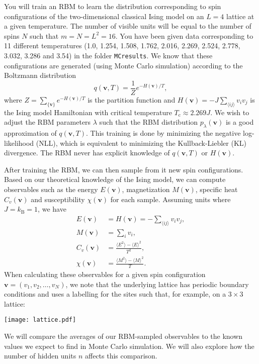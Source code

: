 \documentclass[letterpaper]{scrartcl}
\newcommand{\beq}{\begin{equation}}
\newcommand{\eeq}{\end{equation}}
\begin{document}
You will train an RBM to learn the distribution corresponding to spin configurations of
the two-dimensional classical Ising model on an $L=4$ lattice at a given temperature.
The number of visible units will be equal to the number of spins $N$ such that $m = N = L^2 = 16$.
You have been given data corresponding to 11 different temperatures (1.0, 1.254, 1.508, 1.762, 2.016, 2.269, 2.524, 2.778, 3.032, 3.286 and 3.54) in the folder \texttt{MC{\textunderscore}results}.
We know that these configurations are generated (using Monte Carlo simulation) according to the Boltzmann distribution
\beq
q(\mathbf{v},T) = \frac{1}{Z} e^{-H(\mathbf{v})/T},
\eeq
where $Z = \sum_{\{ \mathbf{v} \}}e^{-H(\mathbf{v})/T}$ is the partition function and $H(\mathbf{v}) = -J \sum_{\langle i j \rangle} v_i v_j$ is the Ising model Hamiltonian with critical temperature $T_\text{c} \approx 2.269 J$.
We wish to adjust the RBM parameters $\lambda$ such that the RBM distribution $p_\lambda(\mathbf{v})$ is a good approximation of $q(\mathbf{v},T)$.
This training is done by minimizing the negative log-likelihood (NLL), which is equivalent to minimizing the Kullback-Liebler (KL) divergence.
The RBM never has explicit knowledge of $q(\mathbf{v},T)$ or $H(\mathbf{v})$.

After training the RBM, we can then sample from it new spin configurations.
Based on our theoretical knowledge of the Ising model, we can compute observables such as
the energy $E(\mathbf{v})$, magnetization $M(\mathbf{v})$, specific heat $C_v(\mathbf{v})$ and susceptibility $\chi(\mathbf{v})$ for each sample.
Assuming units where $J = k_\text{B} = 1$, we have
\begin{align*}
E(\mathbf{v}) &= H(\mathbf{v}) = -\sum_{\langle i j \rangle} v_i v_j, \\
M(\mathbf{v}) &= \sum_i v_i , \\
C_v(\mathbf{v}) &= \frac{\langle E^2 \rangle - \langle E \rangle^2}{T^2}, \\
\chi(\mathbf{v}) &= \frac{\langle M^2 \rangle - \langle M \rangle^2}{T}.
\end{align*}
When calculating these observables for a given spin configuration $\mathbf{v} = (v_1, v_2, \ldots, v_N)$, we note that the underlying lattice has periodic boundary conditions and uses a labelling for the sites such that, for example, on a $3\times 3$ lattice:
\begin{center}
\texttt{[image: lattice.pdf]}
\end{center}
We will compare the averages of our RBM-sampled observables to the known values we expect to find in Monte Carlo simulation.
We will also explore how the number of hidden units $n$ affects this comparison.
\end{document}

